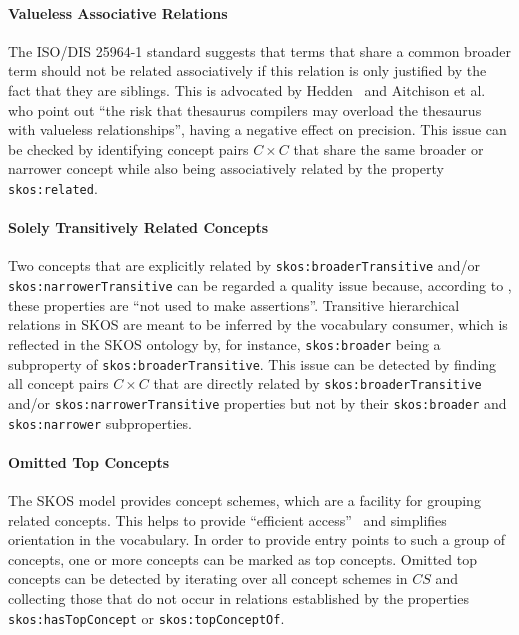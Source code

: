 \paragraph{Valueless Associative Relations}

The ISO/DIS 25964-1 standard \cite{ISO25964-1:2011} suggests that terms that share a common broader term should not be related associatively if this relation is only justified by the fact that they are siblings. This is advocated by Hedden~\cite{Hedden2010} and Aitchison et al.~\cite{Aitchison2000} who point out ``the risk that thesaurus compilers may overload the thesaurus with valueless relationships'', having a negative effect on precision.
This issue can be checked by identifying concept pairs $C \times C$ that share the same broader or narrower concept while also being associatively related by the property \texttt{skos:related}.

\paragraph{Solely Transitively Related Concepts}

Two concepts that are explicitly related by \texttt{skos:broaderTransitive} and/or \texttt{skos:narrowerTransitive} can be regarded a quality issue because, according to \cite{SkosReference2008}, these properties are ``not used to make assertions''. Transitive hierarchical relations in SKOS are meant to be inferred by the vocabulary consumer, which is reflected in the SKOS ontology by, for instance, \texttt{skos:broader} being a subproperty of \texttt{skos:broaderTransitive}. 
This issue can be detected by finding all concept pairs $C \times C$ that are directly related by \texttt{skos:broaderTransitive} and/or \texttt{skos:narrowerTransitive} properties but not by their \texttt{skos:broader} and \texttt{skos:narrower} subproperties.

\paragraph{Omitted Top Concepts}

The SKOS model provides concept schemes, which are a facility for grouping related concepts. This helps to provide ``efficient access''~\cite{Isaac2009} and simplifies orientation in the vocabulary. In order to provide entry points to such a group of concepts, one or more concepts can be marked as top concepts.  
Omitted top concepts can be detected by iterating over all concept schemes in $CS$ and collecting those that do not occur in relations established by the properties \texttt{skos:hasTopConcept} or \texttt{skos:topConceptOf}.

